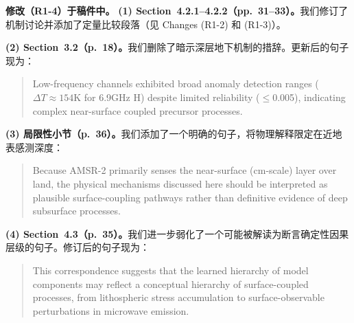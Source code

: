 \documentclass[11pt]{article}
\newcommand{\revchange}[1]{\begingroup\color{changecolor}#1\endgroup}
\begin{document}
\revchange{%
\textbf{修改（R1-4）于稿件中。}
\textbf{(1) Section~4.2.1--4.2.2（pp.~31--33）。}我们修订了机制讨论并添加了定量比较段落（见 Changes (R1-2) 和 (R1-3)）。

\medskip

\textbf{(2) Section~3.2（p.~18）。}我们删除了暗示深层地下机制的措辞。更新后的句子现为：
\begin{quote}
Low-frequency channels exhibited broad anomaly detection ranges ($\Delta T \approx 154$K for 6.9GHz H) despite limited reliability ($\le$0.005), indicating complex near-surface coupled precursor processes.
\end{quote}

\medskip

\textbf{(3) 局限性小节（p.~36）。}我们添加了一个明确的句子，将物理解释限定在近地表感测深度：
\begin{quote}
Because AMSR-2 primarily senses the near-surface (cm-scale) layer over land, the physical mechanisms discussed here should be interpreted as plausible surface-coupling pathways rather than definitive evidence of deep subsurface processes.
\end{quote}

\medskip

\textbf{(4) Section~4.3（p.~35）。}我们进一步弱化了一个可能被解读为断言确定性因果层级的句子。修订后的句子现为：
\begin{quote}
This correspondence suggests that the learned hierarchy of model components may reflect a conceptual hierarchy of surface-coupled processes, from lithospheric stress accumulation to surface-observable perturbations in microwave emission.
\end{quote}
}
\end{document}
